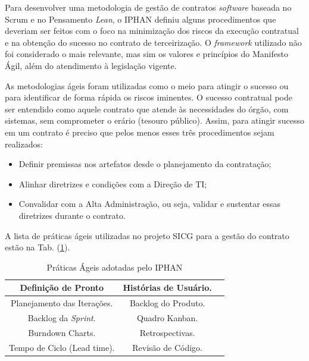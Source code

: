 Para desenvolver uma metodologia de gestão de contratos \textit{software} baseada no Scrum e no Pensamento \textit{Lean}, o IPHAN definiu alguns procedimentos que deveriam ser feitos com o foco na minimização dos riscos da execução contratual e na obtenção do sucesso no contrato de terceirização. O \textit{framework} utilizado não foi considerado o mais relevante, mas sim os valores e princípios do Manifesto Ágil, além do atendimento à legislação vigente. 

As metodologias ágeis foram utilizadas como o meio para atingir o sucesso ou para identificar de forma rápida os riscos iminentes. O sucesso contratual pode ser entendido como aquele contrato que atende às necessidades do órgão, com sistemas, sem comprometer o erário (tesouro público). Assim, para atingir sucesso em um contrato é preciso que pelos menos esses três procedimentos sejam realizados: 
\begin{itemize}
\item Definir premissas nos artefatos desde o planejamento da contratação;
\item Alinhar diretrizes e condições com a Direção de TI;
\item Convalidar com a Alta Administração, ou seja, validar e sustentar essas diretrizes durante o contrato.
\end{itemize}

A lista de práticas ágeis utilizadas no projeto SICG para a gestão do contrato estão na Tab. (\ref{praticasiphan}).

\begin{table}[H]
\center
\footnotesize
\begin{tabular}{|c|c|c|}
\hline
 Definição de Pronto              &   Histórias de Usuário.              \\ \hline
Planejamento das Iterações.  &  Backlog do Produto.           \\ \hline
  Backlog da \textit{Sprint}.             &   Quadro Kanban.              \\ \hline
Burndown Charts.         &  Retrospectivas.            \\ \hline
Tempo de Ciclo (Lead time).         &  Revisão de Código.               \\ \hline
\end{tabular}
\caption{Práticas Ágeis adotadas pelo IPHAN}
\label{praticasiphan}
\end{table}


